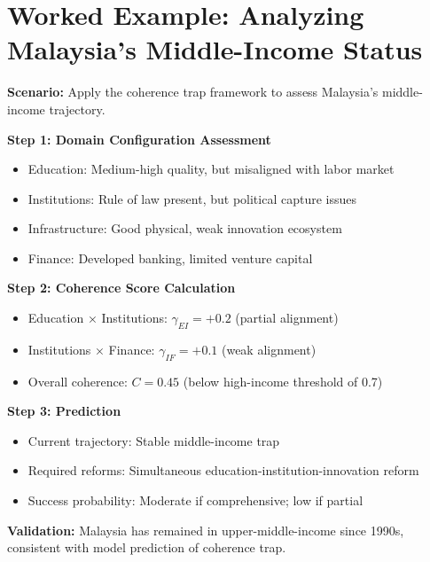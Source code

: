 \section{Worked Example: Analyzing Malaysia's Middle-Income Status}
\label{sec:p06-worked-example}

\begin{tcolorbox}[colback=green!5!white, colframe=green!75!black,
    title=Worked Example: Malaysia's Coherence Assessment]

\textbf{Scenario:} Apply the coherence trap framework to assess Malaysia's
middle-income trajectory.

\textbf{Step 1: Domain Configuration Assessment}
\begin{itemize}[nosep]
    \item Education: Medium-high quality, but misaligned with labor market
    \item Institutions: Rule of law present, but political capture issues
    \item Infrastructure: Good physical, weak innovation ecosystem
    \item Finance: Developed banking, limited venture capital
\end{itemize}

\textbf{Step 2: Coherence Score Calculation}
\begin{itemize}[nosep]
    \item Education × Institutions: $\gamma_{EI} = +0.2$ (partial alignment)
    \item Institutions × Finance: $\gamma_{IF} = +0.1$ (weak alignment)
    \item Overall coherence: $C = 0.45$ (below high-income threshold of 0.7)
\end{itemize}

\textbf{Step 3: Prediction}
\begin{itemize}[nosep]
    \item Current trajectory: Stable middle-income trap
    \item Required reforms: Simultaneous education-institution-innovation reform
    \item Success probability: Moderate if comprehensive; low if partial
\end{itemize}

\textbf{Validation:} Malaysia has remained in upper-middle-income since 1990s,
consistent with model prediction of coherence trap.

\end{tcolorbox}


